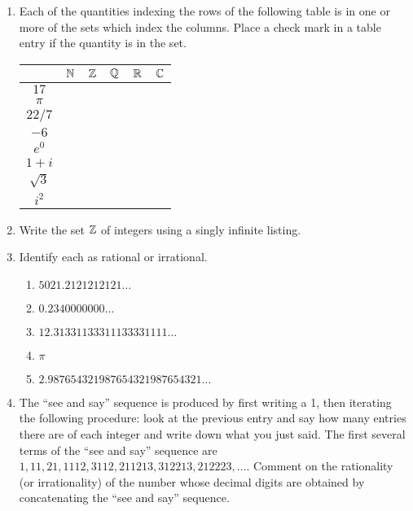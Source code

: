 \begin{enumerate}

\item Each of the quantities indexing the rows of the following table
is in one or more of the sets which index the columns.  Place a 
check mark in a table entry if the quantity is in the set.

\begin{tabular}{|c||c|c|c|c|c|} \hline
 & ${\mathbb N}$ & ${\mathbb Z}$ & ${\mathbb Q}$ & ${\mathbb R}$ & ${\mathbb C}$
 \\ \hline\hline
\rule{0pt}{15pt} $17$ & & & & & \\ \hline
\rule{0pt}{15pt} $\pi$ & & & & & \\ \hline
\rule{0pt}{15pt} $22/7$ & & & & & \\ \hline
\rule{0pt}{15pt} $-6$ & & & & & \\ \hline
\rule{0pt}{15pt} $e^0$ & & & & & \\ \hline
\rule{0pt}{15pt} $1+i$ & & & & & \\ \hline
\rule{0pt}{15pt} $\sqrt{3}$ & & & & & \\ \hline
\rule{0pt}{15pt} $i^2$ & & & & & \\  \hline
\end{tabular}

\vfill

\workbookpagebreak

\item Write the set ${\mathbb Z}$ of integers using a singly infinite
listing.

\vfill


\item Identify each as rational or irrational.
\begin{enumerate}
\item $5021.2121212121\ldots$
\item $0.2340000000\ldots$
\item $12.31331133311133331111\ldots$
\item $\pi$
\item $2.987654321987654321987654321\ldots$
\end{enumerate}

\vfill

\textbookpagebreak

\item The ``see and say'' sequence is produced by first writing a 1, 
then iterating the following procedure:  look at the previous entry 
and say how many entries there are of each integer and write down what 
you just said.  The first several terms of the ``see and say'' sequence 
are $1, 11, 21, 1112, 3112, 211213, 312213, 212223, \ldots$.  Comment on the
rationality (or irrationality) of the number whose decimal digits are obtained 
by concatenating the ``see and say'' sequence.


\end{enumerate}
